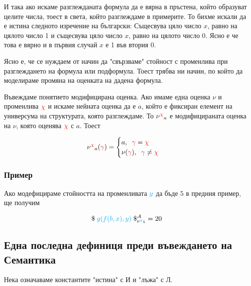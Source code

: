 \documentclass{article}[12pt]
\begin{document}
И така ако искаме разглежданата формула да е вярна в пръстена, който образуват целите числа,
тоест в света, който разглеждаме в примерите.
То бихме искали да е истина следното изречение на български:
Същесвува цяло число \(x\), равно на цялото число 1 и същесвува цяло число \(x\), равно на цялото число 0.
Ясно е че това е вярно и в първия случай \(x\) е 1 във втория 0.

\vspace{0.5cm}

Ясно е, че се нуждаем от начин да "свързваме" стойност с променлива при разглеждането на формула или подформула. 
Тоест трябва ни начин, по който да моделираме промяна на оценката на дадена формула.

\vspace{0.5cm}

Въвеждаме понятието модифицирана оценка.
Ако имаме една оценка \(\nu\) и променлива \(\color{red} \chi\) и искаме нейната оценка да е \(a\),
който е фиксиран елемент на универсума на структурата, която разглеждаме.
То \(\nu^{\color{red} \chi}_{\color{black} a}\) е модифицираната оценка на \(\nu\),
която оценява \(\color{red} \chi\) с \(a\). Тоест

\begin{align*}
\nu^{\color{red} \chi}_{\color{black} a} (\color{red} \gamma \color{black}) = \begin{cases}
 a , \;\; \color{red} \gamma \color{black} = \color{red} \chi \color{black} \\
\nu(\color{red} \gamma \color{black}) , \;\; \color{red} \gamma \color{black} \neq \color{red} \chi \color{black}
\end{cases}
\end{align*}

\subsubsection{Пример}

Ако модефицираме стойността на променливата \(\color{cyan} y\) да бъде \(5\) в предния пример,
ще получим

\begin{align*}
\displaystyle{\$ \; \color{cyan}g(f(b, x), y) \color{black} \; \$^{\mathcal{A}}_{\nu^{\color{cyan} y}_{\color{black} 5}}} = 20
\end{align*}

\subsection{Една последна дефиниця преди въвеждането на Семантика}
Нека означаваме константите "истина" с И и "лъжа" с Л.
\end{document}
